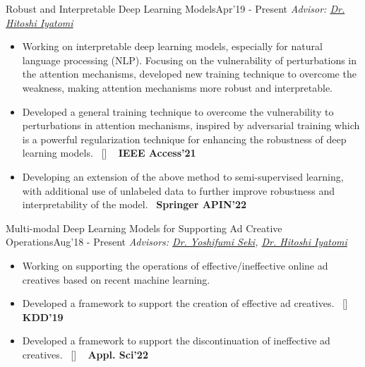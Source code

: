 
\begin{projects}

	\project
	{Robust and Interpretable Deep Learning Models}{Apr'19 - Present}
	{
		\textit{Advisor:  \href{https://iyatomi-lab.info/english/people/2013-6-8}{Dr. Hitoshi Iyatomi}}
	}
	{\begin{itemize}
			\setlength\itemsep{0.3em}
			\item Working on interpretable deep learning models, especially for natural language processing (NLP). Focusing on the vulnerability of perturbations in the attention mechanisms, developed new training technique to overcome the weakness, making attention mechanisms more robust and interpretable.
			\item Developed a general training technique to overcome the vulnerability to perturbations in attention mechanisms, inspired by adversarial training which is a powerful regularization technique for enhancing the robustness of deep learning models.~ [\href{http://shunk031.github.io/attention-meets-perturbation/}{\small{\websiteSymbol}}] ~ {\small{\lbrack\textbf{{IEEE Access'21}}\rbrack}}
			\item Developing an extension of the above method to semi-supervised learning, with additional use of unlabeled data to further improve robustness and interpretability of the model.~ {\small{\lbrack\textbf{{Springer APIN'22}}\rbrack}}
		\end{itemize}}

	\project
	{Multi-modal Deep Learning Models for Supporting Ad Creative Operations}{Aug'18 - Present}
	{
		\textit{Advisors:  \href{https://scholar.google.com/citations?user=LoZ7VeYAAAAJ}{Dr. Yoshifumi Seki}, \href{https://iyatomi-lab.info/english/people/2013-6-8}{Dr. Hitoshi Iyatomi}}
	}
	{\begin{itemize}
			\setlength\itemsep{0.3em}
			\item Working on supporting the operations of effective/ineffective online ad creatives based on recent machine learning.
			\item Developed a framework to support the creation of effective ad creatives.~ [\href{https://github.com/shunk031/Multi-task-Conditional-Attention-Networks}{\small{\githubSymbol}}] ~ {\small{\lbrack\textbf{{KDD'19}}\rbrack}}
			\item Developed a framework to support the discontinuation of ineffective ad creatives.~ [\href{https://www.mdpi.com/2076-3417/12/7/3594}{\small{\websiteSymbol}}] ~ {\small{\lbrack\textbf{{Appl. Sci'22}}\rbrack}}
		\end{itemize}}


\end{projects}
